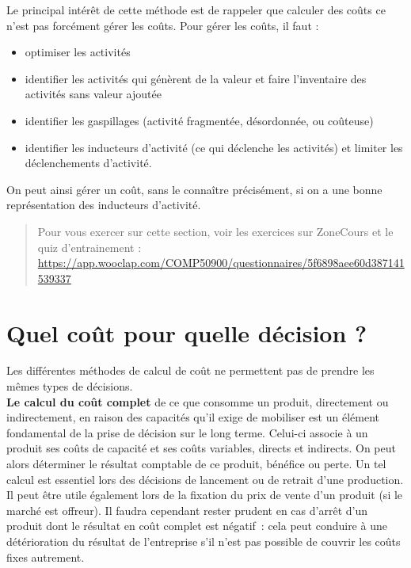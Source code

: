 \documentclass{kaobook}
\begin{document}
Le principal intérêt de cette méthode est de rappeler que calculer des coûts ce n’est pas forcément gérer les coûts. Pour gérer les coûts, il faut :\\
\begin{itemize}
\item optimiser les activités\\
\item identifier les activités qui génèrent de la valeur et faire l’inventaire des activités sans valeur ajoutée\\
\item identifier les gaspillages (activité fragmentée, désordonnée, ou coûteuse)\\
\item identifier les inducteurs d’activité (ce qui déclenche les activités) et limiter les déclenchements d’activité.\\
\end{itemize}

On peut ainsi gérer un coût, sans le connaître précisément, si on a une bonne représentation des inducteurs d'activité.\\

\begin{quote}
Pour vous exercer sur cette section, voir les exercices sur ZoneCours et le quiz d'entrainement : \url{https://app.wooclap.com/COMP50900/questionnaires/5f6898aee60d387141539337}\\
\end{quote}

\section{Quel coût pour quelle décision ?}
\label{sec:org846d2a9}
Les différentes méthodes de calcul de coût ne permettent pas de prendre les mêmes types de décisions.\\

\textbf{Le calcul du coût complet} de ce que consomme un produit, directement ou indirectement, en raison des capacités qu'il exige de mobiliser est un élément fondamental de la prise de décision sur le long terme. Celui-ci associe à un produit ses coûts de capacité et ses coûts variables, directs et indirects. On peut alors déterminer le résultat comptable de ce produit, bénéfice ou perte. Un tel calcul est essentiel lors des décisions de lancement ou de retrait d'une production. Il peut être utile également lors de la fixation du prix de vente d'un produit (si le marché est offreur). Il faudra cependant rester prudent en cas d'arrêt d'un produit dont le résultat en coût complet est négatif : cela peut conduire à une détérioration du résultat de l'entreprise s'il n'est pas possible de couvrir les coûts fixes autrement.\\
\end{document}
